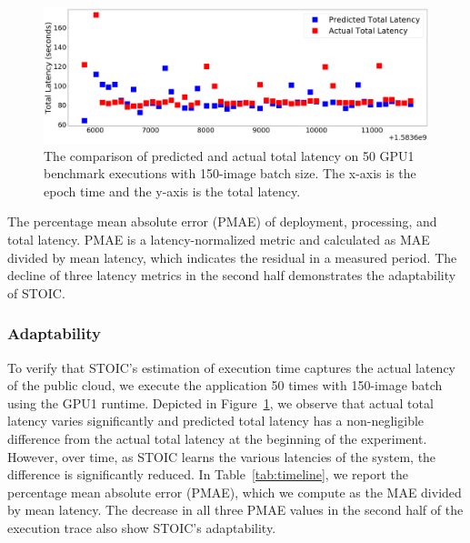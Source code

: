  
 \begin{figure}
    \centering
    \includegraphics[scale=0.20]{figures/timeline.png}
    \caption{The comparison of predicted and actual total latency on 50 GPU1 benchmark executions with 150-image batch size. The x-axis is the epoch time and the y-axis is the total latency. \label{fig:timeline}}
\end{figure}

\begin{table}
\centering
\resizebox{340pt}{!}{

}
\caption{The percentage mean absolute error (PMAE) of deployment, processing, and total latency. PMAE is a latency-normalized metric and calculated as MAE divided by mean latency, which indicates the residual in a measured period. The decline of three latency metrics in the second half demonstrates the adaptability of STOIC.
\label{tab:timeline}}
\end{table}
 
 \subsubsection{Adaptability}
 
To verify that STOIC's estimation of execution time captures the actual latency of the public cloud, we execute the application 50 times with 150-image batch using the GPU1 runtime. Depicted in Figure~\ref{fig:timeline}, we observe that actual total latency varies significantly and predicted total latency has a non-negligible difference from the actual total latency at the beginning of the experiment. However, over time, as STOIC learns the various latencies of the system, the difference is significantly reduced. In Table~\ref{tab:timeline}, we report the percentage mean absolute error (PMAE), which we compute as the MAE divided by mean latency. The decrease in all three PMAE values in the second half of the execution trace also show STOIC's adaptability.

